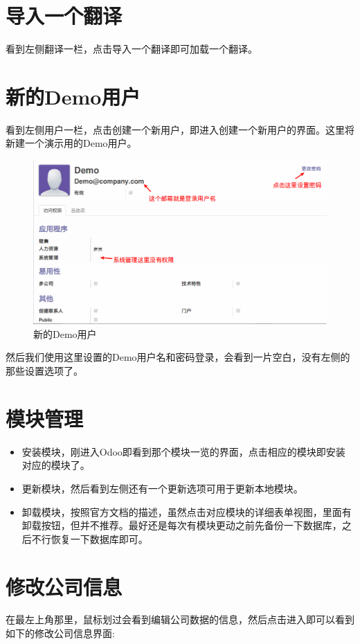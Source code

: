 \documentclass[11pt,a4paper]{sphinxmanual}
\begin{document}
\section{导入一个翻译}
\label{sec-4-4}
看到左侧翻译一栏，点击导入一个翻译即可加载一个翻译。

\section{新的Demo用户}
\label{sec-4-5}
看到左侧用户一栏，点击创建一个新用户，即进入创建一个新用户的界面。这里将新建一个演示用的Demo用户。

\begin{figure}[H]
\centering
\includegraphics[keepaspectratio,max width=0.95\linewidth]{images/新的Demo用户.png}
\caption{新的Demo用户}
\end{figure}

然后我们使用这里设置的Demo用户名和密码登录，会看到一片空白，没有左侧的那些设置选项了。

\section{模块管理}
\label{sec-4-6}
\begin{itemize}
\item 安装模块，刚进入Odoo即看到那个模块一览的界面，点击相应的模块即安装对应的模块了。
\item 更新模块，然后看到左侧还有一个更新选项可用于更新本地模块。
\item 卸载模块，按照官方文档的描述，虽然点击对应模块的详细表单视图，里面有卸载按钮，但并不推荐。最好还是每次有模块更动之前先备份一下数据库，之后不行恢复一下数据库即可。
\end{itemize}



\section{修改公司信息}
\label{sec-4-7}
在最左上角那里，鼠标划过会看到编辑公司数据的信息，然后点击进入即可以看到如下的修改公司信息界面:
\end{document}
